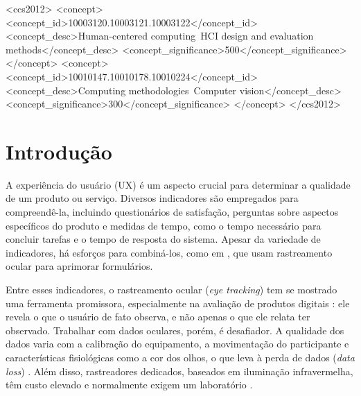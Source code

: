 \documentclass[sigconf, nonacm, language=english, language=portuguese, natbib=false]{acmart}
\begin{document}
\begin{CCSXML}
<ccs2012>
   <concept>
       <concept_id>10003120.10003121.10003122</concept_id>
       <concept_desc>Human-centered computing~HCI design and evaluation methods</concept_desc>
       <concept_significance>500</concept_significance>
   </concept>
   <concept>
       <concept_id>10010147.10010178.10010224</concept_id>
       <concept_desc>Computing methodologies~Computer vision</concept_desc>
       <concept_significance>300</concept_significance>
   </concept>
</ccs2012>
\end{CCSXML}



\maketitle

\section{Introdução}

A experiência do usuário (UX) é um aspecto crucial para determinar a qualidade de um produto ou serviço. Diversos indicadores são empregados para compreendê-la, incluindo questionários de satisfação, perguntas sobre aspectos específicos do produto e medidas de tempo, como o tempo necessário para concluir tarefas e o tempo de resposta do sistema. Apesar da variedade de indicadores, há esforços para combiná-los, como em \textcite{strohl2015}, que usam rastreamento ocular para aprimorar formulários.

Entre esses indicadores, o rastreamento ocular (\emph{eye tracking}) tem se mostrado uma ferramenta promissora, especialmente na avaliação de produtos digitais \cite{zardari2021, bojko2005eye}: ele revela o que o usuário de fato observa, e não apenas o que ele relata ter observado. Trabalhar com dados oculares, porém, é desafiador. A qualidade dos dados varia com a calibração do equipamento, a movimentação do participante e características fisiológicas como a cor dos olhos, o que leva à perda de dados (\emph{data loss}) \cite{nystrom2013, hessels2015}. Além disso, rastreadores dedicados, baseados em iluminação infravermelha, têm custo elevado e normalmente exigem um laboratório \cite{holmqvist2011eye}.
\end{document}
